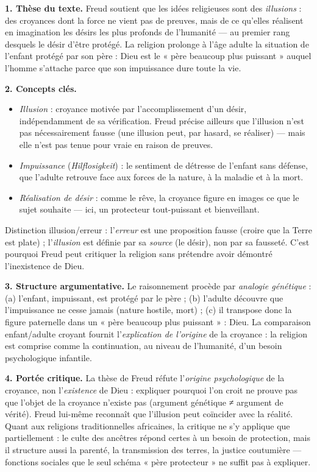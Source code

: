 \documentclass[11pt]{article}
\begin{document}
\begin{corrige}

\textbf{1. Thèse du texte.} Freud soutient que les idées religieuses sont des \emph{illusions} : des croyances dont la force ne vient pas de preuves, mais de ce qu'elles réalisent en imagination les désirs les plus profonds de l'humanité — au premier rang desquels le désir d'être protégé. La religion prolonge à l'âge adulte la situation de l'enfant protégé par son père : Dieu est le « père beaucoup plus puissant » auquel l'homme s'attache parce que son impuissance dure toute la vie.

\textbf{2. Concepts clés.}
\begin{itemize}
\item \emph{Illusion} : croyance motivée par l'accomplissement d'un désir, indépendamment de sa vérification. Freud précise ailleurs que l'illusion n'est pas nécessairement fausse (une illusion peut, par hasard, se réaliser) — mais elle n'est pas tenue pour vraie en raison de preuves.
\item \emph{Impuissance} (\emph{Hilflosigkeit}) : le sentiment de détresse de l'enfant sans défense, que l'adulte retrouve face aux forces de la nature, à la maladie et à la mort.
\item \emph{Réalisation de désir} : comme le rêve, la croyance figure en images ce que le sujet souhaite — ici, un protecteur tout-puissant et bienveillant.
\end{itemize}
Distinction illusion/erreur : l'\emph{erreur} est une proposition fausse (croire que la Terre est plate) ; l'\emph{illusion} est définie par sa \emph{source} (le désir), non par sa fausseté. C'est pourquoi Freud peut critiquer la religion sans prétendre avoir démontré l'inexistence de Dieu.

\textbf{3. Structure argumentative.} Le raisonnement procède par \emph{analogie génétique} : (a) l'enfant, impuissant, est protégé par le père ; (b) l'adulte découvre que l'impuissance ne cesse jamais (nature hostile, mort) ; (c) il transpose donc la figure paternelle dans un « père beaucoup plus puissant » : Dieu. La comparaison enfant/adulte croyant fournit l'\emph{explication de l'origine} de la croyance : la religion est comprise comme la continuation, au niveau de l'humanité, d'un besoin psychologique infantile.

\textbf{4. Portée critique.} La thèse de Freud réfute l'\emph{origine psychologique} de la croyance, non l'\emph{existence} de Dieu : expliquer pourquoi l'on croit ne prouve pas que l'objet de la croyance n'existe pas (argument génétique ≠ argument de vérité). Freud lui-même reconnaît que l'illusion peut coïncider avec la réalité. Quant aux religions traditionnelles africaines, la critique ne s'y applique que partiellement : le culte des ancêtres répond certes à un besoin de protection, mais il structure aussi la parenté, la transmission des terres, la justice coutumière — fonctions sociales que le seul schéma « père protecteur » ne suffit pas à expliquer.


\end{corrige}
\end{document}
